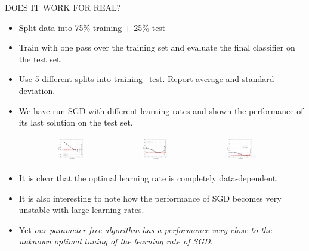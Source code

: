 \documentclass[final,t,serif,mathserif]{beamer}
\def\spazioo{\vspace{-0.3cm}}
\begin{document}
\begin{frame}{}
\begin{columns}[t]
\begin{column}{.33\linewidth}
    \begin{block}{DOES IT WORK FOR REAL?}
      \spazioo
      \begin{itemize}
        \item Split data into 75\% training + 25\% test
        \item Train with one pass over the training set and evaluate the final classifier on the test set.
        \item Use 5 different splits into training+test. Report average and standard deviation.
        \item We have run SGD with different learning rates and shown the performance of its last solution on the test set.
       \end{itemize}
      \begin{figure}[t]
	\centering
	\begin{tabular}{ccc}
	\includegraphics[width=0.32\textwidth]{../figs/yearPredictionMSD_kt_train_test-crop.pdf} &
        \includegraphics[width=0.32\textwidth]{../figs/cpusmall_kt_train_test-crop.pdf} &
        \includegraphics[width=0.32\textwidth]{../figs/cadata_kt_train_test-crop.pdf}
	\end{tabular}
      \end{figure}
      \begin{itemize}
        \item It is clear that the optimal learning rate is completely data-dependent.
        \item It is also interesting to note how the performance of SGD becomes very unstable with large learning rates. \item Yet \emph{our parameter-free algorithm has a performance very close to the unknown optimal tuning of the learning rate of SGD}.
       \end{itemize}
    \end{block}
\end{column}



\end{columns}
\end{frame}
\end{document}
